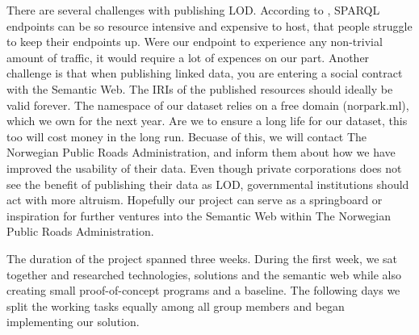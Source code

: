\vspace{5mm}

There are several challenges with publishing LOD. According to \cite{can-i-sparql-your-endpoint}, SPARQL endpoints can be so resource intensive and expensive to host, that people struggle to keep their endpoints up. Were our endpoint to experience any non-trivial amount of traffic, it would require a lot of expences on our part. Another challenge is that when publishing linked data, you are entering a social contract with the Semantic Web. The IRIs of the published resources should ideally be valid forever. The namespace of our dataset relies on a free domain (norpark.ml), which we own for the next year. Are we to ensure a long life for our dataset, this too will cost money in the long run. Becuase of this, we will contact The Norwegian Public Roads Administration, and inform them about how we have improved the usability of their data. Even though private corporations does not see the benefit of publishing their data as LOD, governmental institutions should act with more altruism. Hopefully our project can serve as a springboard or inspiration for further ventures into the Semantic Web within The Norwegian Public Roads Administration.

\vspace{5mm}

The duration of the project spanned three weeks. During the first week, we sat together and researched technologies, solutions and the semantic web while also creating small proof-of-concept programs and a baseline. The following days we split the working tasks equally among all group members and began implementing our solution.
